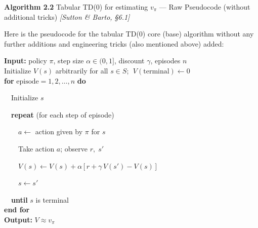 \documentclass[11pt]{article}
\begin{document}
    \label{pseudo-2-2}

    \begin{pseudobox}

\textbf{Algorithm 2.2} Tabular TD(0) for estimating \(v_\pi\) --- Raw
Pseudocode (without additional tricks) \emph{{[}Sutton \& Barto,
§6.1{]}}

\tcbline

Here is the pseudocode for the tabular TD(0) core (base) algorithm
without any further additions and engineering tricks (also mentioned
above) added:

\textbf{Input:} policy \(\pi\), step size \(\alpha \in (0, 1]\),
discount \(\gamma\), episodes \(n\)\\
Initialize \(V(s)\) arbitrarily for all \(s \in S\);
\(\;V(\text{terminal}) \leftarrow 0\)\\
\textbf{for} \(\text{episode} = 1, 2, \ldots, n\) \textbf{do}\\
\strut ~~Initialize \(s\)\\
\strut ~~\textbf{repeat} (for each step of episode)\\
\strut ~~~~\(a \leftarrow\) action given by \(\pi\) for \(s\)\\
\strut ~~~~Take action \(a\); observe \(r,\; s'\)\\
\strut ~~~~\(V(s) \leftarrow V(s) + \alpha\,\bigl[\, r + \gamma\, V(s') - V(s) \,\bigr]\)\\
\strut ~~~~\(s \leftarrow s'\)\\
\strut ~~\textbf{until} \(s\) is terminal\\
\textbf{end for}\\
\textbf{Output:} \(V \approx v_{\pi}\)

\end{pseudobox}
\end{document}
